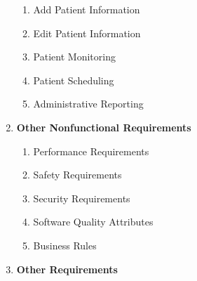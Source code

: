 \documentclass[12pt]{article}
\renewcommand{\_}{\kern-1.5pt\textunderscore\kern-1.5pt}
\begin{document}
\begin{enumerate}
\begin{enumerate}
	\item {\fontsize{13pt}{15.6pt}\selectfont Add Patient Information\par}\par

	\item {\fontsize{13pt}{15.6pt}\selectfont Edit Patient Information\par}\par

	\item {\fontsize{13pt}{15.6pt}\selectfont Patient Monitoring\par}\par

	\item {\fontsize{13pt}{15.6pt}\selectfont Patient Scheduling\par}\par

	\item {\fontsize{13pt}{15.6pt}\selectfont Administrative Reporting\par}\par


\end{enumerate}
	\item {\fontsize{13pt}{15.6pt}\selectfont \textbf{Other Nonfunctional Requirements}\par}\par

\begin{enumerate}
	\item {\fontsize{13pt}{15.6pt}\selectfont Performance Requirements\par}\par

	\item {\fontsize{13pt}{15.6pt}\selectfont Safety Requirements\par}\par

	\item {\fontsize{13pt}{15.6pt}\selectfont Security Requirements\par}\par

	\item {\fontsize{13pt}{15.6pt}\selectfont Software Quality Attributes\par}\par

	\item {\fontsize{13pt}{15.6pt}\selectfont Business Rules\par}\par


\end{enumerate}
	\item {\fontsize{13pt}{15.6pt}\selectfont \textbf{Other Requirements}\par}
\end{enumerate}\par
\end{document}
